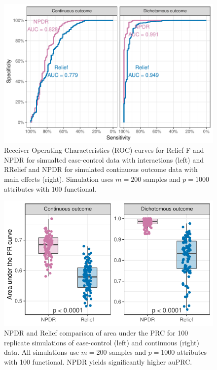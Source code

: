 \documentclass{article}
\begin{document}
\begin{figure}[h]%
\centerline{\includegraphics[]{../figs/npdr_relief_auroc.pdf}}
\caption{Receiver Operating Characteristics (ROC) curves for Relief-F and NPDR for simualted case-control data with interactions (left) and RRelief and NPDR for simulated continuous outcome data with main effects (right). Simulation uses $m = 200$ samples and $p = 1000$ attributes with 100 functional. }
\label{fig:auROC}
\end{figure}

\begin{figure}[h]%
\centerline{\includegraphics[]{../figs/pr_compare_100.pdf}}
\caption{NPDR and Relief comparison of area under the PRC for 100 replicate simulations of case-control (left) and continuous (right) data. All simulations use $m = 200$ samples and $p = 1000$ attributes with 100 functional. NPDR yields significantly higher auPRC.}
\label{fig:auPRC}
\end{figure}
\end{document}
